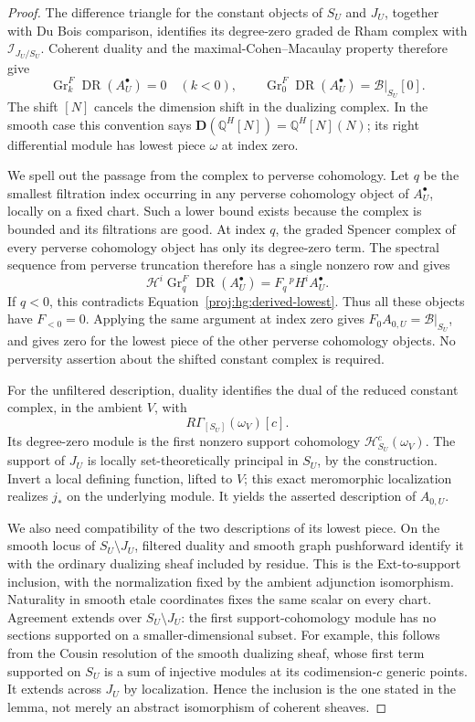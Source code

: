 \documentclass[11pt,letterpaper]{article}
\newcommand{\Q}{\mathbb{Q}}
\DeclareMathOperator{\Gr}{Gr}
\DeclareMathOperator{\DR}{DR}
\theoremstyle{definition}
\theoremstyle{remark}
\begin{document}
\begin{proof}
The difference triangle for the constant objects of \(S_U\) and
\(J_U\), together with Du Bois comparison, identifies its
degree-zero graded de Rham complex with
\(\mathcal I_{J_U/S_U}\).  Coherent duality and the
maximal-Cohen--Macaulay property therefore give
\begin{equation}\label{proj:hg:derived-lowest}
 \Gr^F_k\DR(A^\bullet_U)=0\quad(k<0),
 \qquad
 \Gr^F_0\DR(A^\bullet_U)=\mathcal B|_{S_U}[0].
\end{equation}
The shift \([N]\) cancels the dimension shift in the dualizing
complex.  In the smooth case this convention says
\(\mathbf D(\Q^H[N])=\Q^H[N](N)\); its right differential module
has lowest piece \(\omega\) at index zero.

We spell out the passage from the complex to perverse cohomology.
Let \(q\) be the smallest filtration index occurring in any
perverse cohomology object of \(A^\bullet_U\), locally on a fixed
chart.  Such a lower bound exists because the complex is bounded
and its filtrations are good.  At index \(q\), the graded Spencer
complex of every perverse cohomology object has only its
degree-zero term.  The spectral sequence from perverse truncation
therefore has a single nonzero row and gives
\[
 \mathcal H^i\Gr^F_q\DR(A^\bullet_U)
   =F_q\,{}^p\!H^iA^\bullet_U.
\]
If \(q<0\), this contradicts Equation~\eqref{proj:hg:derived-lowest}.
Thus all these objects have \(F_{<0}=0\).  Applying the same
argument at index zero gives \(F_0A_{0,U}=\mathcal B|_{S_U}\),
and gives zero for the lowest piece of the other perverse
cohomology objects.  No perversity assertion about the shifted
constant complex is required.

For the unfiltered description, duality identifies the dual of the
reduced constant complex, in the ambient \(V\), with
\[
 R\Gamma_{[S_U]}(\omega_V)[c].
\]
Its degree-zero module is the first nonzero support cohomology
\(\mathcal H^c_{S_U}(\omega_V)\).  The support of \(J_U\) is locally
set-theoretically principal in \(S_U\), by the construction.
Invert a local defining function, lifted to \(V\); this exact
meromorphic localization realizes \(j_*\) on the underlying
module.  It yields the asserted description of \(A_{0,U}\).

We also need compatibility of the two descriptions of its lowest
piece.  On the smooth locus of \(S_U\setminus J_U\), filtered
duality and smooth graph pushforward identify it with the ordinary
dualizing sheaf included by residue.  This is the Ext-to-support
inclusion, with the normalization fixed by the ambient adjunction
isomorphism.  Naturality in smooth etale coordinates fixes the
same scalar on every chart.  Agreement extends over
\(S_U\setminus J_U\): the first support-cohomology module has no
sections supported on a smaller-dimensional subset.  For example,
this follows from the Cousin resolution of the smooth dualizing
sheaf, whose first term supported on \(S_U\) is a sum of injective
modules at its codimension-\(c\) generic points.  It extends across
\(J_U\) by localization.  Hence the inclusion is the one stated
in the lemma, not merely an abstract isomorphism of coherent
sheaves.


\end{proof}
\end{document}
